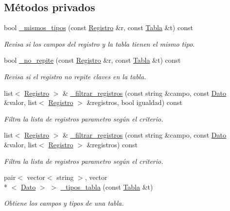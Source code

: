 \subsection*{Métodos privados}
{\bf }\par
\begin{DoxyCompactItemize}
\item 
bool \hyperlink{classBaseDeDatos_adf046a8fde5505668174122997ebb147}{\-\_\-mismos\-\_\-tipos} (const \hyperlink{classRegistro}{Registro} \&r, const \hyperlink{classTabla}{Tabla} \&t) const 
\begin{DoxyCompactList}\small\item\em Revisa si los campos del registro y la tabla tienen el mismo tipo. \end{DoxyCompactList}\item 
bool \hyperlink{classBaseDeDatos_a64ea8616111fb54b0804fe7560668ff6}{\-\_\-no\-\_\-repite} (const \hyperlink{classRegistro}{Registro} \&r, const \hyperlink{classTabla}{Tabla} \&t) const 
\begin{DoxyCompactList}\small\item\em Revisa si el registro no repite claves en la tabla. \end{DoxyCompactList}\item 
list$<$ \hyperlink{classRegistro}{Registro} $>$ \& \hyperlink{classBaseDeDatos_a14edefd67e0fca7c3f7f2e965424916a}{\-\_\-filtrar\-\_\-registros} (const string \&campo, const \hyperlink{classDato}{Dato} \&valor, list$<$ \hyperlink{classRegistro}{Registro} $>$ \&registros, bool igualdad) const 
\begin{DoxyCompactList}\small\item\em Filtra la lista de registros parametro según el criterio. \end{DoxyCompactList}\item 
list$<$ \hyperlink{classRegistro}{Registro} $>$ \& \hyperlink{classBaseDeDatos_ab64f6c5aed35a029620da579853733ba}{\-\_\-filtrar\-\_\-registros} (const string \&campo, const \hyperlink{classDato}{Dato} \&valor, list$<$ \hyperlink{classRegistro}{Registro} $>$ \&registros) const 
\begin{DoxyCompactList}\small\item\em Filtra la lista de registros parametro según el criterio. \end{DoxyCompactList}\item 
pair$<$ vector$<$ string $>$, vector\\*
$<$ \hyperlink{classDato}{Dato} $>$ $>$ \hyperlink{classBaseDeDatos_ad5b99bf20095789ca5636bf0593ad8a5}{\-\_\-tipos\-\_\-tabla} (const \hyperlink{classTabla}{Tabla} \&t)
\begin{DoxyCompactList}\small\item\em Obtiene los campos y tipos de una tabla. \end{DoxyCompactList}\end{DoxyCompactItemize}

